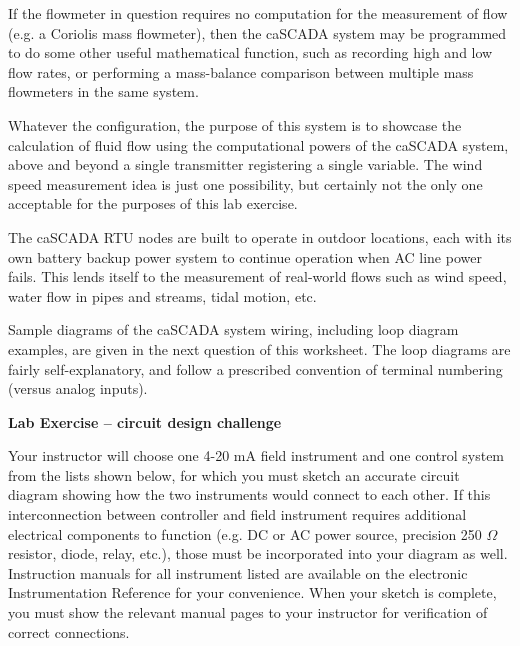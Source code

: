 If the flowmeter in question requires no computation for the measurement of flow (e.g. a Coriolis mass flowmeter), then the caSCADA system may be programmed to do some other useful mathematical function, such as recording high and low flow rates, or performing a mass-balance comparison between multiple mass flowmeters in the same system.

\vskip 10pt

Whatever the configuration, the purpose of this system is to showcase the calculation of fluid flow using the computational powers of the caSCADA system, above and beyond a single transmitter registering a single variable.  The wind speed measurement idea is just one possibility, but certainly not the only one acceptable for the purposes of this lab exercise.

\vskip 10pt

The caSCADA RTU nodes are built to operate in outdoor locations, each with its own battery backup power system to continue operation when AC line power fails.  This lends itself to the measurement of real-world flows such as wind speed, water flow in pipes and streams, tidal motion, etc.

Sample diagrams of the caSCADA system wiring, including loop diagram examples, are given in the next question of this worksheet.  The loop diagrams are fairly self-explanatory, and follow a prescribed convention of terminal numbering (versus analog inputs).






\vfil \eject

\noindent
{\bf Lab Exercise -- circuit design challenge}

\vskip 5pt

Your instructor will choose one 4-20 mA field instrument and one control system from the lists shown below, for which you must sketch an accurate circuit diagram showing how the two instruments would connect to each other.  If this interconnection between controller and field instrument requires additional electrical components to function (e.g. DC or AC power source, precision 250 $\Omega$ resistor, diode, relay, etc.), those must be incorporated into your diagram as well.  Instruction manuals for all instrument listed are available on the electronic Instrumentation Reference for your convenience.  When your sketch is complete, you must show the relevant manual pages to your instructor for verification of correct connections.


